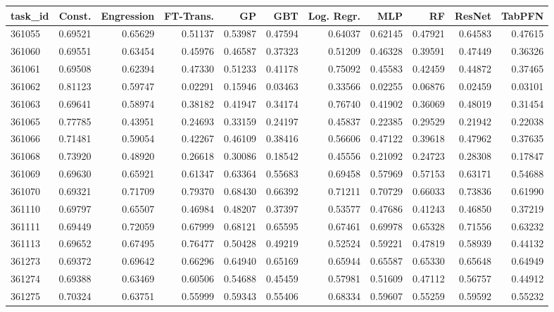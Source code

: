 \begin{tabular}{lrrrrrrrrrr}
\toprule
task\_id & Const. & Engression & FT-Trans. & GP & GBT & Log. Regr. & MLP & RF & ResNet & TabPFN \\
\midrule
361055 & 0.69521 & 0.65629 & 0.51137 & 0.53987 & 0.47594 & 0.64037 & 0.62145 & 0.47921 & 0.64583 & 0.47615 \\
361060 & 0.69551 & 0.63454 & 0.45976 & 0.46587 & 0.37323 & 0.51209 & 0.46328 & 0.39591 & 0.47449 & 0.36326 \\
361061 & 0.69508 & 0.62394 & 0.47330 & 0.51233 & 0.41178 & 0.75092 & 0.45583 & 0.42459 & 0.44872 & 0.37465 \\
361062 & 0.81123 & 0.59747 & 0.02291 & 0.15946 & 0.03463 & 0.33566 & 0.02255 & 0.06876 & 0.02459 & 0.03101 \\
361063 & 0.69641 & 0.58974 & 0.38182 & 0.41947 & 0.34174 & 0.76740 & 0.41902 & 0.36069 & 0.48019 & 0.31454 \\
361065 & 0.77785 & 0.43951 & 0.24693 & 0.33159 & 0.24197 & 0.45837 & 0.22385 & 0.29529 & 0.21942 & 0.22038 \\
361066 & 0.71481 & 0.59054 & 0.42267 & 0.46109 & 0.38416 & 0.56606 & 0.47122 & 0.39618 & 0.47962 & 0.37635 \\
361068 & 0.73920 & 0.48920 & 0.26618 & 0.30086 & 0.18542 & 0.45556 & 0.21092 & 0.24723 & 0.28308 & 0.17847 \\
361069 & 0.69630 & 0.65921 & 0.61347 & 0.63364 & 0.55683 & 0.69458 & 0.57969 & 0.57153 & 0.63171 & 0.54688 \\
361070 & 0.69321 & 0.71709 & 0.79370 & 0.68430 & 0.66392 & 0.71211 & 0.70729 & 0.66033 & 0.73836 & 0.61990 \\
361110 & 0.69797 & 0.65507 & 0.46984 & 0.48207 & 0.37397 & 0.53577 & 0.47686 & 0.41243 & 0.46850 & 0.37219 \\
361111 & 0.69449 & 0.72059 & 0.67999 & 0.68121 & 0.65595 & 0.67461 & 0.69978 & 0.65328 & 0.71556 & 0.63232 \\
361113 & 0.69652 & 0.67495 & 0.76477 & 0.50428 & 0.49219 & 0.52524 & 0.59221 & 0.47819 & 0.58939 & 0.44132 \\
361273 & 0.69372 & 0.69642 & 0.66296 & 0.64940 & 0.65169 & 0.65944 & 0.65587 & 0.65330 & 0.65648 & 0.64949 \\
361274 & 0.69388 & 0.63469 & 0.60506 & 0.54688 & 0.45459 & 0.57981 & 0.51609 & 0.47112 & 0.56757 & 0.44912 \\
361275 & 0.70324 & 0.63751 & 0.55999 & 0.59343 & 0.55406 & 0.68334 & 0.59607 & 0.55259 & 0.59592 & 0.55232 \\

\end{tabular}
